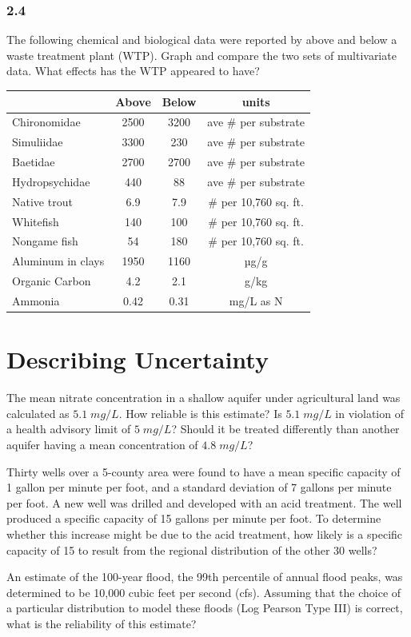 \documentclass[]{book}
\begin{document}
\hypertarget{section-6}{%
\subsection*{2.4}\label{section-6}}

The following chemical and biological data were reported by \citet{frenzel_physical_1988} above and below a waste treatment plant (WTP). Graph and compare the two sets of multivariate data. What effects has the WTP appeared to have?

\begin{longtable}[]{@{}lccc@{}}
\toprule
& Above & Below & units\tabularnewline
\midrule
\endhead
Chironomidae & 2500 & 3200 & ave \# per substrate\tabularnewline
Simuliidae & 3300 & 230 & ave \# per substrate\tabularnewline
Baetidae & 2700 & 2700 & ave \# per substrate\tabularnewline
Hydropsychidae & 440 & 88 & ave \# per substrate\tabularnewline
Native trout & 6.9 & 7.9 & \# per 10,760 sq. ft.\tabularnewline
Whitefish & 140 & 100 & \# per 10,760 sq. ft.\tabularnewline
Nongame fish & 54 & 180 & \# per 10,760 sq. ft.\tabularnewline
Aluminum in clays & 1950 & 1160 & µg/g\tabularnewline
Organic Carbon & 4.2 & 2.1 & g/kg\tabularnewline
Ammonia & 0.42 & 0.31 & mg/L as N\tabularnewline
\bottomrule
\end{longtable}

\hypertarget{ch3}{%
\chapter{Describing Uncertainty}\label{ch3}}

The mean nitrate concentration in a shallow aquifer under agricultural land was calculated as \(5.1 \; mg/L\). How reliable is this estimate? Is \(5.1 \; mg/L\) in violation of a health advisory limit of \(5 \; mg/L\)? Should it be treated differently than another aquifer having a mean concentration of \(4.8 \; mg/L\)?

Thirty wells over a 5-county area were found to have a mean specific capacity of 1 gallon per minute per foot, and a standard deviation of 7 gallons per minute per foot. A new well was drilled and developed with an acid treatment. The well produced a specific capacity of 15 gallons per minute per foot. To determine whether this increase might be due to the acid treatment, how likely is a specific capacity of 15 to result from the regional distribution of the other 30 wells?

An estimate of the 100-year flood, the 99th percentile of annual flood peaks, was determined to be 10,000 cubic feet per second (cfs). Assuming that the choice of a particular distribution to model these floods (Log Pearson Type III) is correct, what is the reliability of this estimate?
\end{document}
